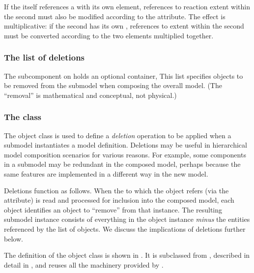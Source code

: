 If the \Submodel itself references a \Model with its own \Submodel element, references to reaction extent within the second \Submodel must also be modified according to the  attribute.  The effect is multiplicative: if the second \Submodel has its own , references to extent within the second \Submodel must be converted according to the two  elements multiplied together.


\subsubsection{The list of deletions}
\label{listofdeletions}

The  subcomponent on \Submodel holds an optional \ListOfDeletions container,   This list specifies objects to be removed from the submodel when composing the overall model.  (The ``removal'' is mathematical and conceptual, not physical.)


\subsubsection{The  class}
\label{deletion-class}

The \Deletion object class is used to define a \emph{deletion} operation to be applied when a submodel instantiates a model definition. Deletions may be useful in hierarchical model composition scenarios for various reasons.  For example, some components in a submodel may be redundant in the composed model, perhaps because the same features are implemented in a different way in the new model.

Deletions function as follows.  When the \Model to which the \Submodel object refers (via the  attribute) is read and processed for inclusion into the composed model, each \Deletion object identifies an object to ``remove'' from that \Model instance.  The resulting submodel instance consists of everything in the \Model object instance \emph{minus} the entities referenced by the list of \Deletion objects. We discuss the implications of deletions further below.

The definition of the \Deletion object class is shown in .  It is subclassed from \SBaseRef, described in detail in , and reuses all the machinery provided by \SBaseRef.


